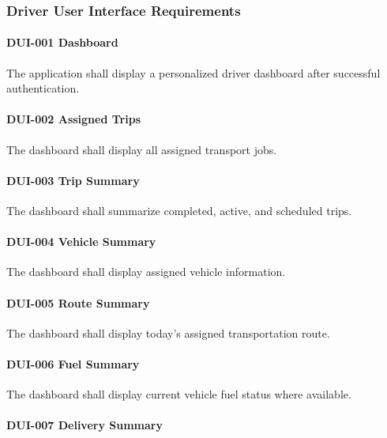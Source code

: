 
\subsubsection*{Driver User Interface Requirements}

\paragraph{DUI-001 Dashboard}

The application shall display a personalized driver dashboard after
successful authentication.

\paragraph{DUI-002 Assigned Trips}

The dashboard shall display all assigned transport jobs.

\paragraph{DUI-003 Trip Summary}

The dashboard shall summarize completed, active, and scheduled trips.

\paragraph{DUI-004 Vehicle Summary}

The dashboard shall display assigned vehicle information.

\paragraph{DUI-005 Route Summary}

The dashboard shall display today's assigned transportation route.

\paragraph{DUI-006 Fuel Summary}

The dashboard shall display current vehicle fuel status where available.

\paragraph{DUI-007 Delivery Summary}

